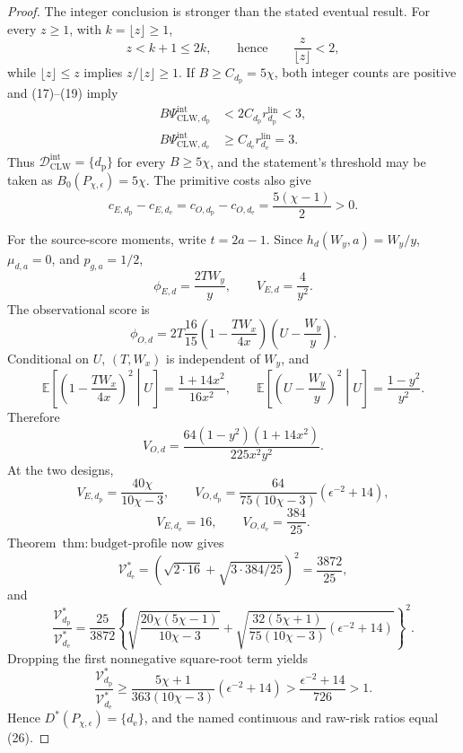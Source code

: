 \documentclass{article}
\begin{document}
\begin{proof}
The integer conclusion is stronger than the stated eventual result.  For every \(z\ge1\), with \(k=\lfloor z\rfloor\ge1\),
\[
 z<k+1\le2k,
 \qquad\text{hence}\qquad \frac z{\lfloor z\rfloor}<2,   \tag{19}
\]
while \(\lfloor z\rfloor\le z\) implies \(z/\lfloor z\rfloor\ge1\).  If \(B\ge C_{d_{\mathrm p}}=5\chi\), both integer counts are positive and (17)--(19) imply
\[
\begin{aligned}
 B\Psi_{\mathrm{CLW},d_{\mathrm p}}^{\mathrm{int}}
 &<2C_{d_{\mathrm p}}r_{d_{\mathrm p}}^{\mathrm{lin}}<3,\\
 B\Psi_{\mathrm{CLW},d_{\mathrm e}}^{\mathrm{int}}
 &\ge C_{d_{\mathrm e}}r_{d_{\mathrm e}}^{\mathrm{lin}}=3.
\end{aligned}                                               \tag{20}
\]
Thus \(\mathcal D_{\mathrm{CLW}}^{\mathrm{int}}=\{d_{\mathrm p}\}\) for every \(B\ge5\chi\), and the statement's threshold may be taken as \(B_0(P_{\chi,\epsilon})=5\chi\).  The primitive costs also give
\[
 c_{E,d_{\mathrm p}}-c_{E,d_{\mathrm e}}
 =c_{O,d_{\mathrm p}}-c_{O,d_{\mathrm e}}
 =\frac{5(\chi-1)}2>0.                                    \tag{21}
\]

For the source-score moments, write \(t=2a-1\).  Since \(h_d(W_y,a)=W_y/y\), \(\mu_{d,a}=0\), and \(p_{g,a}=1/2\),
\[
 \phi_{E,d}=\frac{2TW_y}{y},
 \qquad V_{E,d}=\frac4{y^2}.                              \tag{22}
\]
The observational score is
\[
 \phi_{O,d}=2T\frac{16}{15}
 \left(1-\frac{TW_x}{4x}\right)
 \left(U-\frac{W_y}{y}\right).
\]
Conditional on \(U\), \((T,W_x)\) is independent of \(W_y\), and
\[
 \mathbb E\!\left[\left(1-\frac{TW_x}{4x}\right)^2\middle|U\right]
 =\frac{1+14x^2}{16x^2},
 \qquad
 \mathbb E\!\left[\left(U-\frac{W_y}{y}\right)^2\middle|U\right]
 =\frac{1-y^2}{y^2}.
\]
Therefore
\[
 V_{O,d}=\frac{64(1-y^2)(1+14x^2)}{225x^2y^2}.             \tag{23}
\]
At the two designs,
\[
 V_{E,d_{\mathrm p}}=\frac{40\chi}{10\chi-3},
 \qquad
 V_{O,d_{\mathrm p}}=
 \frac{64}{75(10\chi-3)}(\epsilon^{-2}+14),              \tag{24}
\]
\[
 V_{E,d_{\mathrm e}}=16,
 \qquad V_{O,d_{\mathrm e}}=\frac{384}{25}.
\]
Theorem~\(\mathrm{thm{:}budget\text{-}profile}\) now gives
\[
 \mathcal V_{d_{\mathrm e}}^*
 =\left(\sqrt{2\cdot16}+\sqrt{3\cdot384/25}\right)^2
 =\frac{3872}{25},                                        \tag{25}
\]
and
\[
 \frac{\mathcal V_{d_{\mathrm p}}^*}{\mathcal V_{d_{\mathrm e}}^*}
 =\frac{25}{3872}
 \left\{
 \sqrt{\frac{20\chi(5\chi-1)}{10\chi-3}}
 +\sqrt{\frac{32(5\chi+1)}{75(10\chi-3)}
 (\epsilon^{-2}+14)}
 \right\}^{2}.                                            \tag{26}
\]
Dropping the first nonnegative square-root term yields
\[
 \frac{\mathcal V_{d_{\mathrm p}}^*}{\mathcal V_{d_{\mathrm e}}^*}
 \ge\frac{5\chi+1}{363(10\chi-3)}(\epsilon^{-2}+14)
 >\frac{\epsilon^{-2}+14}{726}>1.                         \tag{27}
\]
Hence \(D^*(P_{\chi,\epsilon})=\{d_{\mathrm e}\}\), and the named continuous and raw-risk ratios equal (26).


\end{proof}
\end{document}
